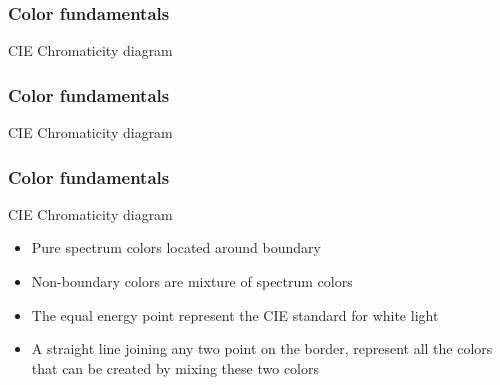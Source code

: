 \documentclass{beamer}
\begin{document}
\begin{frame}
\frametitle{Color fundamentals}
\begin{block}{CIE Chromaticity diagram}
\end{block}
\end{frame}
\begin{frame}
\frametitle{Color fundamentals}
\begin{block}{CIE Chromaticity diagram}
\end{block}
\end{frame}
\begin{frame}
\frametitle{Color fundamentals}
\begin{block}{CIE Chromaticity diagram}
\begin{itemize}
	\item Pure spectrum colors located around boundary 
	\item Non-boundary colors are mixture of spectrum colors
	\item The equal energy point represent the CIE standard for white light 
	\item A straight line joining any two point on the border, represent all the colors that can be created by mixing these two colors
\end{itemize}
\end{block}
\end{frame}
\end{document}
